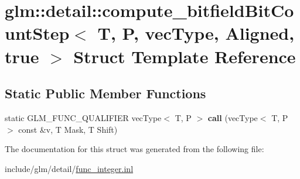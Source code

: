 \hypertarget{structglm_1_1detail_1_1compute__bitfieldBitCountStep_3_01T_00_01P_00_01vecType_00_01Aligned_00_01true_01_4}{}\section{glm\+:\+:detail\+:\+:compute\+\_\+bitfield\+Bit\+Count\+Step$<$ T, P, vec\+Type, Aligned, true $>$ Struct Template Reference}
\label{structglm_1_1detail_1_1compute__bitfieldBitCountStep_3_01T_00_01P_00_01vecType_00_01Aligned_00_01true_01_4}
\subsection*{Static Public Member Functions}
\begin{DoxyCompactItemize}
\item 
\mbox{\label{structglm_1_1detail_1_1compute__bitfieldBitCountStep_3_01T_00_01P_00_01vecType_00_01Aligned_00_01true_01_4_a3c7641484a1e6fe29f0074b29591b0c2}} 
static G\+L\+M\+\_\+\+F\+U\+N\+C\+\_\+\+Q\+U\+A\+L\+I\+F\+I\+ER vec\+Type$<$ T, P $>$ {\bfseries call} (vec\+Type$<$ T, P $>$ const \&v, T Mask, T Shift)
\end{DoxyCompactItemize}


The documentation for this struct was generated from the following file\+:\begin{DoxyCompactItemize}
\item 
include/glm/detail/\hyperlink{func__integer_8inl}{func\+\_\+integer.\+inl}\end{DoxyCompactItemize}
